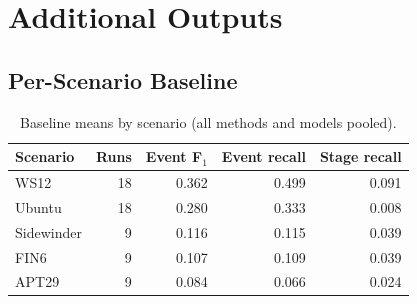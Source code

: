 \chapter{Additional Outputs}
\label{app:outputs}
\section{Per-Scenario Baseline}
\begin{table}[H]
\centering
\caption{Baseline means by scenario (all methods and models pooled).}
\small
\begin{tabular}{@{}lrrrr@{}}
\toprule
\textbf{Scenario} & \textbf{Runs} & \textbf{Event F$_1$} & \textbf{Event recall} & \textbf{Stage recall} \\
\midrule
WS12 & 18 & 0.362 & 0.499 & 0.091 \\
Ubuntu & 18 & 0.280 & 0.333 & 0.008 \\
Sidewinder & 9 & 0.116 & 0.115 & 0.039 \\
FIN6 & 9 & 0.107 & 0.109 & 0.039 \\
APT29 & 9 & 0.084 & 0.066 & 0.024 \\
\bottomrule
\end{tabular}
\end{table}
